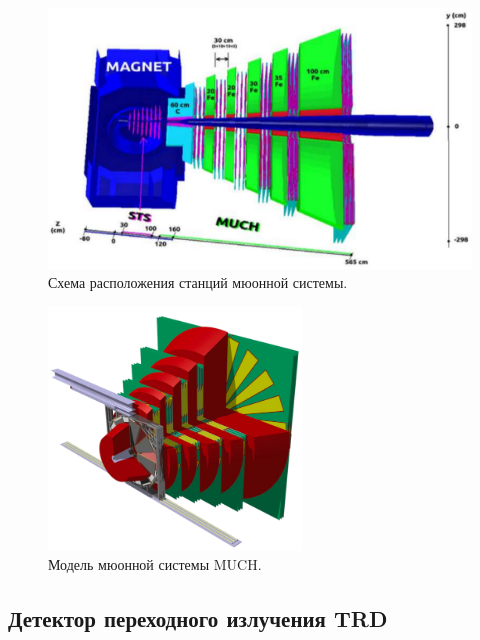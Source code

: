 \begin{figure}[H]
\includegraphics[width=1.0\textwidth]{pictures/MUCH.png}
\caption{Схема расположения станций мюонной системы.}
\label{fig:MUCH}
\end{figure}

\begin{figure}[H]
\includegraphics[width=0.6\textwidth]{pictures/CBM_MUCH_model.png}
\caption{Модель мюонной системы MUCH.}
\label{fig:MUCH2}
\end{figure}


\subsection{Детектор переходного излучения TRD}\label{sec:secTRD}

